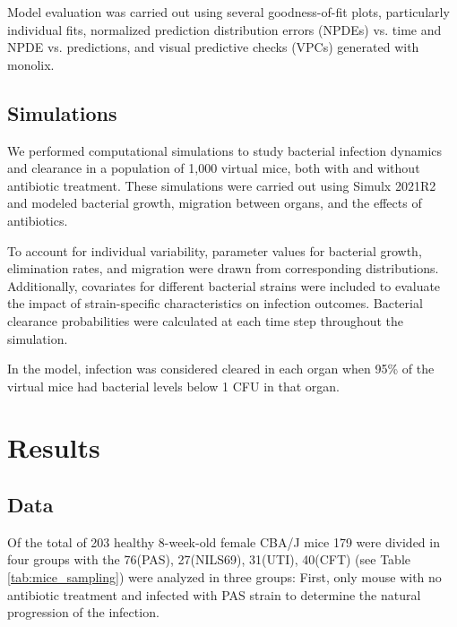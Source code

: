 \documentclass{article}
\begin{document}
Model evaluation was carried out using several goodness-of-fit plots, particularly individual fits, normalized prediction distribution errors (NPDEs) vs. time and NPDE vs. predictions, and visual predictive checks (VPCs) generated with monolix.


\subsection{Simulations}


We performed computational simulations to study bacterial infection dynamics and clearance in a population of 1,000 virtual mice, both with and without antibiotic treatment. These simulations were carried out using Simulx 2021R2 and modeled bacterial growth, migration between organs, and the effects of antibiotics.

To account for individual variability, parameter values for bacterial growth, elimination rates, and migration were drawn from corresponding distributions. Additionally, covariates for different bacterial strains were included to evaluate the impact of strain-specific characteristics on infection outcomes. Bacterial clearance probabilities were calculated at each time step throughout the simulation.

In the model, infection was considered cleared in each organ when 95\% of the virtual mice had bacterial levels below 1 CFU in that organ.





\section{Results}

\subsection{Data}


Of the total of 203 healthy 8-week-old female CBA/J mice 179 were divided in four groups with the 76(PAS), 27(NILS69), 31(UTI), 40(CFT) (see Table \ref{tab:mice_sampling}) were analyzed in three groups: First, only mouse with no antibiotic treatment and infected with PAS strain to determine the natural progression of the infection. 
\end{document}
